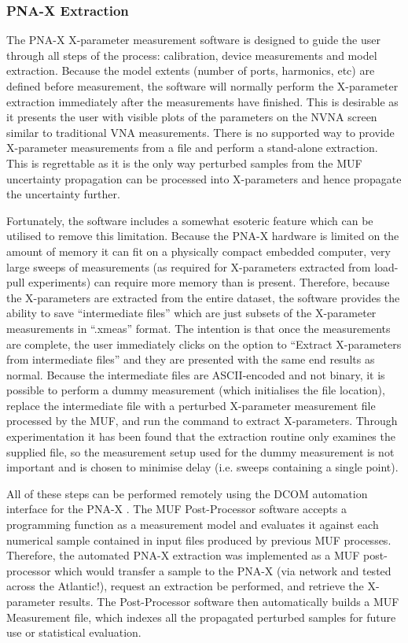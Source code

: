 \documentclass[../thesis/thesis.tex]{subfiles}
\begin{document}
\begin{refsection}
\subsubsection{PNA-X Extraction}

The PNA-X X-parameter measurement software is designed to guide the user through all steps of the process: calibration, device measurements and model extraction. Because the model extents (number of ports, harmonics, etc) are defined before measurement, the software will normally perform the X-parameter extraction immediately after the measurements have finished. This is desirable as it presents the user with visible plots of the parameters on the NVNA screen similar to traditional VNA measurements. There is no supported way to provide X-parameter measurements from a file and perform a stand-alone extraction. This is regrettable as it is the only way perturbed samples from the MUF uncertainty propagation can be processed into X-parameters and hence propagate the uncertainty further.

Fortunately, the software includes a somewhat esoteric feature which can be utilised to remove this limitation. Because the PNA-X hardware is limited on the amount of memory it can fit on a physically compact embedded computer, very large sweeps of measurements (as required for X-parameters extracted from load-pull experiments) can require more memory than is present. Therefore, because the X-parameters are extracted from the entire dataset, the software provides the ability to save ``intermediate files''  which are just subsets of the X-parameter measurements in ``.xmeas'' format.  The intention is that once the measurements are complete, the user immediately clicks on the option to ``Extract X-parameters from intermediate files'' and they are presented with the same end results as normal. Because the intermediate files are ASCII-encoded and not binary, it is possible to perform a dummy measurement (which initialises the file location), replace the intermediate file with a perturbed X-parameter measurement file processed by the MUF, and run the command to extract X-parameters. Through experimentation it has been found that the extraction routine only examines the supplied file, so the measurement setup used for the dummy measurement is not important and is chosen to minimise delay (i.e. sweeps containing a single point).

All of these steps can be performed remotely using the DCOM automation interface for the PNA-X \cite{DCOM}. The MUF Post-Processor software accepts a programming function as a measurement model and evaluates it against each numerical sample contained in input files produced by previous MUF processes. Therefore, the automated PNA-X extraction was implemented as a MUF post-processor which would transfer a sample to the PNA-X (via network and tested across the Atlantic!), request an extraction be performed, and retrieve the X-parameter results. The Post-Processor software then automatically builds a MUF Measurement file, which indexes all the propagated perturbed samples for future use or statistical evaluation.


\end{refsection}
\end{document}
